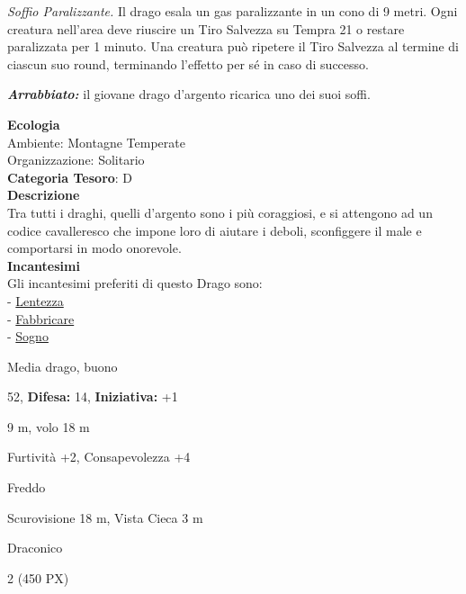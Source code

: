 \begin{multicols}{2}
{\emph{Soffio Paralizzante.} Il drago esala un gas paralizzante in un cono di 9 metri. Ogni creatura nell'area deve riuscire un Tiro Salvezza su Tempra 21 o restare paralizzata per 1 minuto. Una creatura può ripetere il Tiro Salvezza al termine di ciascun suo round, terminando l'effetto per sé in caso di successo.

\emph{\textbf{Arrabbiato:}} il giovane drago d'argento ricarica uno dei suoi soffi.

\textbf{Ecologia}\\
Ambiente: Montagne Temperate\\
Organizzazione: Solitario\\
\textbf{Categoria Tesoro}: D\\
\textbf{Descrizione}\\
Tra tutti i draghi, quelli d'argento sono i più coraggiosi, e si attengono ad un codice cavalleresco che impone loro di aiutare i deboli, sconfiggere il male e comportarsi in modo onorevole.\\
\textbf{Incantesimi}\\
Gli incantesimi preferiti di questo Drago sono:\\
- \hyperlink{lentezza}{Lentezza}\\
- \hyperlink{Fabbricare}{Fabbricare}\\
- \hyperlink{Sogno}{Sogno}

\noindent
\begin{description}[noitemsep, topsep=0pt, parsep=0pt, partopsep=0pt, leftmargin=0cm, labelwidth=2.2cm]
	\item[\textbf{Taglia/Tipo:}] Media drago, buono
	\item[\textbf{Caratt.:}] 
	\item[\textbf{Punti Ferita:}] 52,  \textbf{Difesa:} 14,  \textbf{Iniziativa:} +1
	\item[\textbf{Movimento:}] 9 m, volo 18 m
	\item[\textbf{Tiri Salvez.:}] 
	\item[\textbf{Comp.:}] Furtività +2, Consapevolezza +4
	\item[\textbf{Imm. Danni:}] Freddo
	\item[\textbf{Sensi:}] Scurovisione 18 m, Vista Cieca 3 m
	\item[\textbf{Linguaggi:}] Draconico
	\item[\textbf{Sfida:}] 2 (450 PX)\smallskip
\end{description}

}
\end{multicols}

